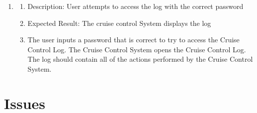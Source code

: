 \documentclass[preprint,11pt,3p]{article}
\begin{document}
\begin{enumerate}
	\item
\begin{enumerate}
	\item Description: User attempts to access the log with the correct password
	\item Expected Result: The cruise control System displays the log
	\item The user inputs a password that is correct to try to access the Cruise Control Log. The Cruise Control System opens the Cruise Control Log. The log should contain all of the actions performed by the Cruise Control System.
\end{enumerate}

\end{enumerate}

\newpage
\section{Issues}
\end{document}
